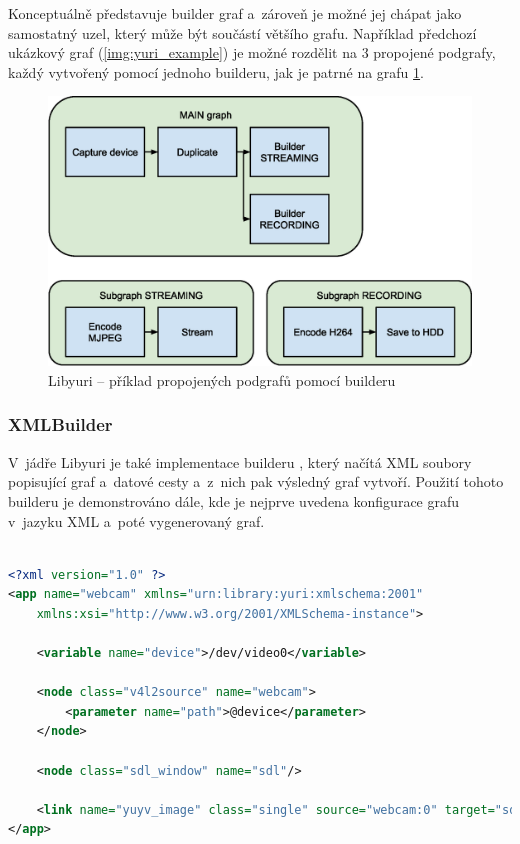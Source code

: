\documentclass[thesis=M,czech]{FITthesis}[2012/06/26]
\begin{document}
Konceptuálně představuje builder graf a~zároveň je možné jej chápat jako samostatný uzel, který může být součástí většího grafu. Například předchozí ukázkový graf (\ref{img:yuri_example}) je možné rozdělit na 3 propojené podgrafy, každý vytvořený pomocí jednoho builderu, jak je patrné na grafu \ref{img:yuri_subgraph}.

\begin{figure}[h]\centering
	\includegraphics[width=1\textwidth]{images/yuri_subgraph.eps}
	\caption{Libyuri -- příklad propojených podgrafů pomocí builderu}\label{img:yuri_subgraph}
\end{figure}
\subsubsection{XMLBuilder} \label{subsec:analyza_yuri_vytvoreni_xml}
V~jádře Libyuri je také implementace builderu , který načítá XML soubory popisující graf a~datové cesty a~z~nich pak výsledný graf vytvoří. Použití tohoto builderu je demonstrováno dále, kde je nejprve uvedena konfigurace grafu v~jazyku XML a~poté vygenerovaný graf.\\ \\

\begin{lstlisting}[language=XML]
<?xml version="1.0" ?>
<app name="webcam" xmlns="urn:library:yuri:xmlschema:2001"
    xmlns:xsi="http://www.w3.org/2001/XMLSchema-instance">

    <variable name="device">/dev/video0</variable>    

    <node class="v4l2source" name="webcam">
        <parameter name="path">@device</parameter>
    </node>
    
    <node class="sdl_window" name="sdl"/>

    <link name="yuyv_image" class="single" source="webcam:0" target="sdl:0"/>
</app>
\end{lstlisting}
\end{document}
